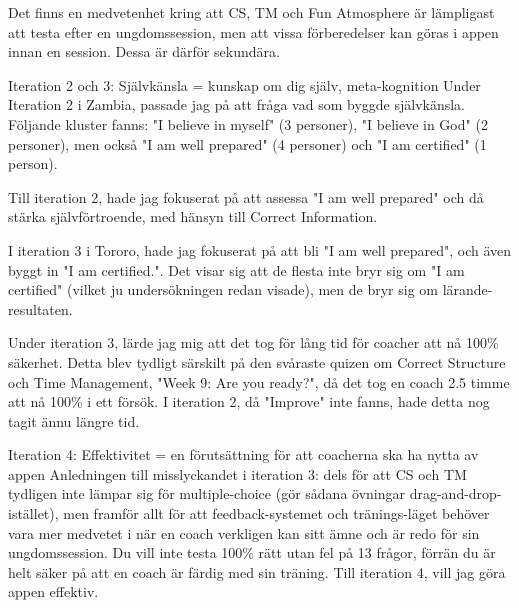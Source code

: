 Det finns en medvetenhet kring att CS, TM och Fun Atmosphere är lämpligast att testa efter en ungdomssession, men att vissa förberedelser kan göras i appen innan en session. Dessa är därför sekundära.

Iteration 2 och 3: Självkänsla = kunskap om dig själv, meta-kognition
Under Iteration 2 i Zambia, passade jag på att fråga vad som byggde självkänsla. Följande kluster fanns: "I believe in myself" (3 personer), "I believe in God" (2 personer), men också "I am well prepared" (4 personer) och "I am certified" (1 person).

Till iteration 2, hade jag fokuserat på att assessa "I am well prepared" och då stärka självförtroende, med hänsyn till Correct Information.

I iteration 3 i Tororo, hade jag fokuserat på att bli "I am well prepared", och även byggt in "I am certified.". Det visar sig att de flesta inte bryr sig om "I am certified" (vilket ju undersökningen redan visade), men de bryr sig om lärande-resultaten.

Under iteration 3, lärde jag mig att det tog för lång tid för coacher att nå 100\% säkerhet. Detta blev tydligt särskilt på den svåraste quizen om Correct Structure och Time Management, "Week 9: Are you ready?", då det tog en coach 2.5 timme att nå 100\% i ett försök. I iteration 2, då "Improve" inte fanns, hade detta nog tagit ännu längre tid.

Iteration 4: Effektivitet = en förutsättning för att coacherna ska ha nytta av appen
Anledningen till misslyckandet i iteration 3: dels för att CS och TM tydligen inte lämpar sig för multiple-choice (gör sådana övningar drag-and-drop-istället), men framför allt för att feedback-systemet och tränings-läget behöver vara mer medvetet i när en coach verkligen kan sitt ämne och är redo för sin ungdomssession. Du vill inte testa 100\% rätt utan fel på 13 frågor, förrän du är helt säker på att en coach är färdig med sin träning. Till iteration 4, vill jag göra appen effektiv.
